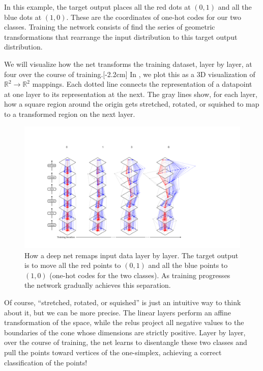 In this example, the target output places all the red dots at $(0,1)$ and all the blue dots at $(1,0)$. These are the coordinates of one-hot codes for our two classes. Training the network consists of find the series of geometric transformations that rearrange the input distribution to this target output distribution.

We will visualize how the net transforms the training dataset, layer by layer, at four  over the course of training.[-2.2cm] In \fig{\ref{fig:neural_nets:nn_training_viz}}, we plot this as a 3D visualization of $\mathbb{R}^2 \rightarrow \mathbb{R}^2$ mappings. Each dotted line connects the representation of a datapoint at one layer to its representation at the next. The gray lines show, for each layer, how a square region around the origin gets stretched, rotated, or squished to map to a transformed region on the next layer.
\begin{figure}[h]
    \centerline{
        \includegraphics[width=1.0\linewidth]{./figures/neural_nets/nn_training_viz2.pdf}
    }
    \caption{How a deep net remaps input data layer by layer. The target output is to move all the red points to $(0,1)$ and all the blue points to $(1,0)$ (one-hot codes for the two classes). As training progresses the network gradually achieves this separation.}
    \label{fig:neural_nets:nn_training_viz}
\end{figure}

Of course, ``stretched, rotated, or squished'' is just an intuitive way to think about it, but we can be more precise. The linear layers perform an affine transformation of the space, while the relus project all negative values to the boundaries of the cone whose dimensions are strictly positive. Layer by layer, over the course of training, the net learns to disentangle these two classes and pull the points toward vertices of the one-simplex, achieving a correct classification of the points!


